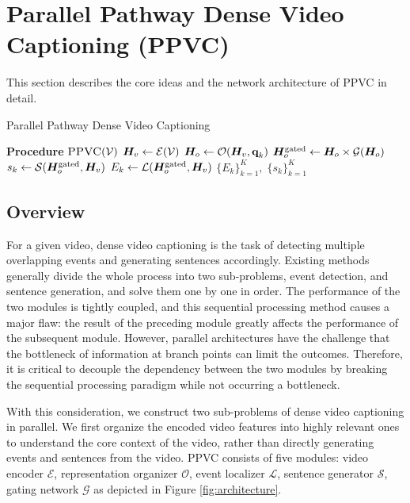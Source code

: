 \section{Parallel Pathway Dense Video Captioning (PPVC)}

This section describes the core ideas and the network architecture of PPVC in detail.

\begin{algorithm}[t]
  \caption{Parallel Pathway Dense Video Captioning}
  \label{algo:ppvc}
  \begin{algorithmic}[1]
    \STATE \textbf{Procedure} $\textsc{PPVC}(\mathcal{V})$
    \STATE $\bm{H}_v \gets \mathcal{E}(\mathcal{V})$ 
      \STATE $\bm{H}_o \gets \mathcal{O}(\bm{H}_v, \textbf{q}_k)$ 
      \STATE $\bm{H}_o^{\text{gated}} \gets \bm{H}_o \times \mathcal{G}(\bm{H}_o)$ 
      \STATE {}
      \STATE $s_{k} \gets \mathcal{S}(\bm{H}_o^{\text{gated}}, \bm{H}_v)$ 
      \STATE $E_{k} \gets \mathcal{L}(\bm{H}_o^{\text{gated}}, \bm{H}_v)$ 
    \ENDFOR
    \RETURN $\{E_{k}\}_{k=1}^{K},\;\{s_{k}\}_{k=1}^{K}$
  \end{algorithmic}
\end{algorithm}

\subsection{Overview}
For a given video, dense video captioning is the task of detecting multiple overlapping events and generating sentences accordingly.
Existing methods generally divide the whole process into two sub-problems, event detection, and sentence generation, and solve them one by one in order.
The performance of the two modules is tightly coupled, and this sequential processing method causes a major flaw: the result of the preceding module greatly affects the performance of the subsequent module.
However, parallel architectures have the challenge that the bottleneck of information at branch points can limit the outcomes.
Therefore, it is critical to decouple the dependency between the two modules by breaking the sequential processing paradigm while not occurring a bottleneck.

With this consideration, we construct two sub-problems of dense video captioning in parallel.
We first organize the encoded video features into highly relevant ones to understand the core context of the video, rather than directly generating events and sentences from the video.
PPVC consists of five modules: video encoder $\mathcal{E}$, representation organizer $\mathcal{O}$, event localizer $\mathcal{L}$, sentence generator $\mathcal{S}$, gating network $\mathcal{G}$ as depicted in Figure \ref{fig:architecture}. 

